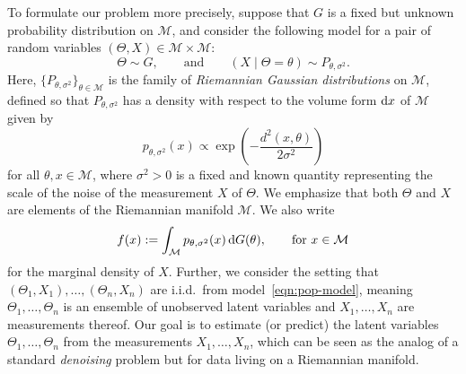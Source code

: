 \documentclass[preprint]{imsart}
\theoremstyle{plain}
\theoremstyle{definition}
\newcommand{\Mcal}{\mathcal{M}}
\newcommand{\diff}{\textnormal{d}}
\begin{document}
    To formulate our problem more precisely, suppose that $G$ is a fixed but unknown probability distribution on $\Mcal$, and consider the following model for a pair of random variables $(\Theta,X)\in\Mcal\times\Mcal$:
    \begin{equation}\label{eqn:pop-model}
        \Theta \sim G, \qquad \mbox{and} \qquad (X \mid \Theta = \theta) \sim P_{\theta,\sigma^2}.
    \end{equation}
Here, $\{P_{\theta,\sigma^2}\}_{\theta\in\Mcal}$ is the family of \textit{Riemannian Gaussian distributions} \cite{PennecRiemNorm} on $\Mcal$, defined so that $P_{\theta,\sigma^2}$ has a density with respect to the volume form $\diff x$ of $\Mcal$ given by
\begin{equation}\label{eqn:Likelihood}
    p_{\theta,\sigma^2}(x) \propto \exp\left(-\frac{d^2(x,\theta)}{2\sigma^2}\right)
\end{equation}
for all $\theta,x\in\Mcal$, where $\sigma^2>0$ is a fixed and known quantity representing the scale of the noise of the measurement $X$ of $\Theta$.
We emphasize that both $\Theta$ and $X$ are elements of the Riemannian manifold $\Mcal$.
We also write
\begin{equation*}
    f(x):= \int_{\Mcal}p_{\theta,\sigma^2}(x)\,\diff G(\theta), \qquad \mbox{for } x \in \Mcal
\end{equation*}
for the marginal density of $X$. Further, we consider the setting that $(\Theta_1,X_1),\ldots ,(\Theta_n,X_n)$ are i.i.d.~from model~\eqref{eqn:pop-model}, meaning $\Theta_1,\ldots, \Theta_n$ is an ensemble of unobserved latent variables and $X_1,\ldots, X_n$ are measurements thereof.
Our goal is to estimate (or predict) the latent variables $\Theta_1,\ldots,\Theta_n$ from the measurements $X_1,\ldots, X_n$, which can be seen as the analog of a standard \textit{denoising} problem but for data living on a Riemannian manifold.
\end{document}
